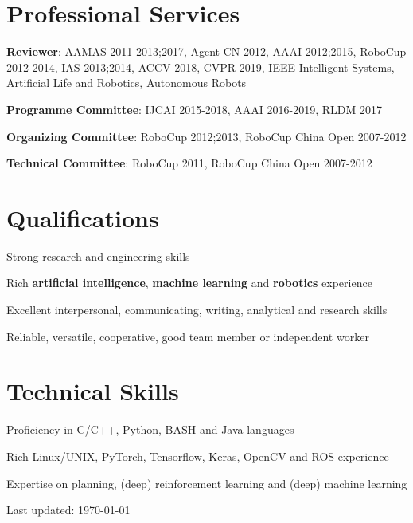 \documentclass[letterpaper,10pt]{article}
\def\footerlink{}
\renewenvironment{itemize}{
  \begin{list}{}{
    \setlength{\leftmargin}{1.5em}
  }
}{
  \end{list}
}
\begin{document}
\vspace{10pt}
\section*{Professional Services}
\begin{itemize}
	\item \textbf{Reviewer}: AAMAS 2011-2013;2017, Agent CN 2012, AAAI 2012;2015, RoboCup 2012-2014, IAS 2013;2014, ACCV 2018, CVPR 2019, IEEE Intelligent Systems, Artificial Life and Robotics, Autonomous Robots
	\item \textbf{Programme Committee}: IJCAI 2015-2018, AAAI 2016-2019, RLDM 2017
	\item \textbf{Organizing Committee}: RoboCup 2012;2013, RoboCup China Open 2007-2012
	\item \textbf{Technical Committee}: RoboCup 2011, RoboCup China Open 2007-2012
\end{itemize}

\vspace{10pt}
\section*{Qualifications}
\begin{itemize}
	\item Strong research and engineering skills
	\item Rich \textbf{artificial intelligence}, \textbf{machine learning} and \textbf{robotics} experience
	\item Excellent interpersonal, communicating, writing, analytical and research skills
	\item Reliable, versatile, cooperative, good team member or independent worker
\end{itemize}

\vspace{10pt}
\section*{Technical Skills}
\begin{itemize}
	\item Proficiency in C/C++, Python, BASH and Java languages
	\item Rich Linux/UNIX, PyTorch, Tensorflow, Keras, OpenCV and ROS experience
	\item Expertise on planning, (deep) reinforcement learning and (deep) machine learning
\end{itemize}

\bigskip

\begin{center}
  \begin{footnotesize}
    Last updated: \today \\
    \href{\footerlink}{\texttt{\footerlink}}
  \end{footnotesize}
\end{center}
\end{document}
